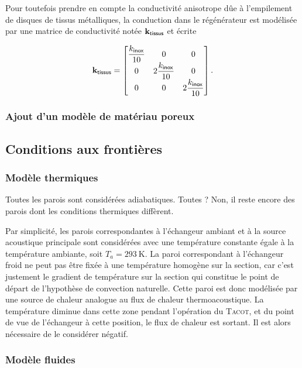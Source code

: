 Pour toutefois prendre en compte la conductivité anisotrope dûe à l'empilement de disques de tissus métalliques, la conduction dans le régénérateur est modélisée par une matrice de conductivité notée $\mathbf k_{\sf tissus}$ et écrite

\begin{equation}
	\mathbf k_{\sf tissus} = \begin{bmatrix}
		\dfrac{k_{\sf inox}}{10} & 0 & 0 \\
		0 & 2\dfrac{k_{\sf inox}}{10} & 0 \\
		0 & 0 & 2\dfrac{k_{\sf inox}}{10}
	\end{bmatrix}.
	\label{eq:ConductiviteTensiorielle}
\end{equation}



\subsubsection{Ajout d'un modèle de matériau poreux}


\subsection{Conditions aux frontières}
\subsubsection{Modèle thermiques}
Toutes les parois sont considérées adiabatiques. Toutes ? Non, il reste encore des parois dont les conditions thermiques diffèrent. 

Par simplicité, les parois correspondantes à l'échangeur ambiant et à la source acoustique principale sont considérées avec une température constante égale à la température ambiante, soit $T_a=\qty{293}{\kelvin}$. La paroi correspondant à l'échangeur froid ne peut pas être fixée à une température homogène sur la section, car c'est justement le gradient de température sur la section qui constitue le point de départ de l'hypothèse de convection naturelle. Cette paroi est donc modélisée par une source de chaleur analogue au flux de chaleur thermoacoustique. La température diminue dans cette zone pendant l'opération du \textsc{Tacot}, et du point de vue de l'échangeur à cette position, le flux de chaleur est sortant. Il est alors nécessaire de le considérer négatif.


\subsubsection{Modèle fluides}

